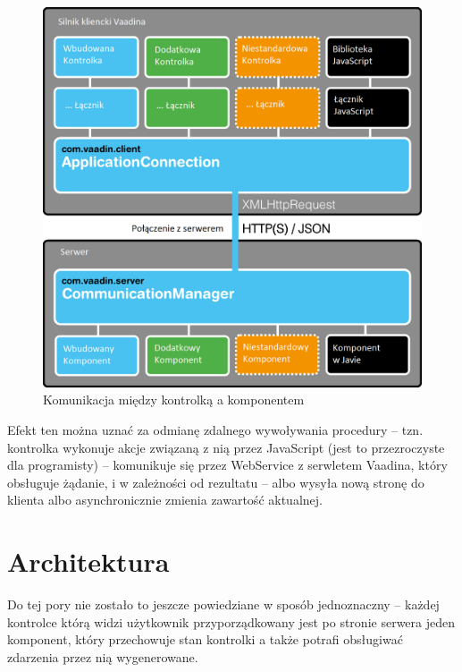 \begin{figure} [H]
    \begin{center}
	\includegraphics[scale=.3]{img/client.png}
	\caption{Komunikacja między kontrolką a komponentem}
	\label{architekturaVaadin}
    \end{center}
\end{figure}

Efekt ten można uznać za odmianę zdalnego wywoływania procedury – tzn. kontrolka wykonuje akcje związaną z nią przez JavaScript (jest to przezroczyste dla programisty) – komunikuje się przez WebService z serwletem Vaadina, który obsługuje żądanie, i w zależności od rezultatu – albo wysyła nową stronę do klienta albo asynchronicznie zmienia zawartość aktualnej.

\section{Architektura}
Do tej pory nie zostało to jeszcze powiedziane w sposób jednoznaczny – każdej kontrolce którą widzi użytkownik przyporządkowany jest po stronie serwera jeden komponent, który przechowuje stan kontrolki a także potrafi obsługiwać zdarzenia przez nią wygenerowane. 

